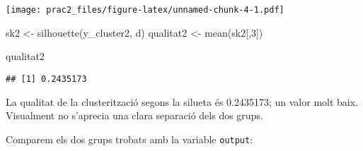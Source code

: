 \documentclass[
]{article}
\newenvironment{Shaded}{\begin{snugshade}}{\end{snugshade}}
\newcommand{\DecValTok}[1]{\textcolor[rgb]{0.86,0.86,0.80}{#1}}
\newcommand{\FunctionTok}[1]{\textcolor[rgb]{0.94,0.94,0.56}{#1}}
\newcommand{\NormalTok}[1]{\textcolor[rgb]{0.80,0.80,0.80}{#1}}
\newcommand{\OtherTok}[1]{\textcolor[rgb]{0.94,0.94,0.56}{#1}}
\begin{document}
\texttt{[image: prac2\_files/figure-latex/unnamed-chunk-4-1.pdf]}

\begin{Shaded}
\begin{Highlighting}[]
\NormalTok{sk2 }\OtherTok{\textless{}{-}} \FunctionTok{silhouette}\NormalTok{(y\_cluster2, d)}
\NormalTok{qualitat2 }\OtherTok{\textless{}{-}} \FunctionTok{mean}\NormalTok{(sk2[,}\DecValTok{3}\NormalTok{])}

\NormalTok{qualitat2}
\end{Highlighting}
\end{Shaded}

\begin{verbatim}
## [1] 0.2435173
\end{verbatim}

La qualitat de la clusterització segons la silueta és 0.2435173; un
valor molt baix. Visualment no s'aprecia una clara separació dels dos
grups.

Comparem els dos grups trobats amb la variable \texttt{output}:
\end{document}
